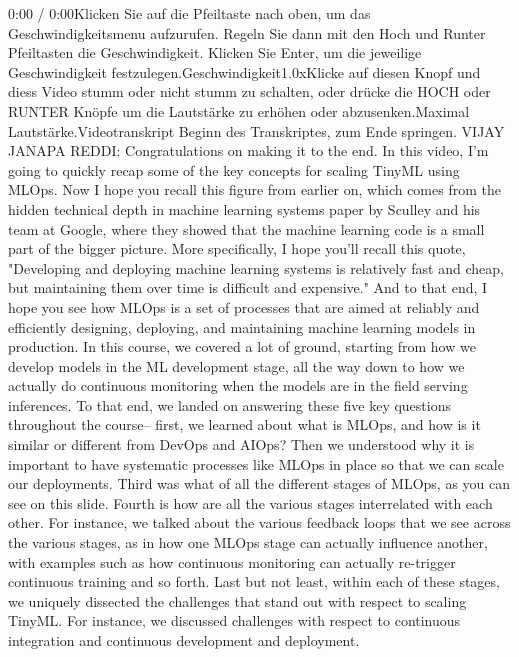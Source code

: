 {{{{{{{{    0:00 / 0:00Klicken Sie auf die Pfeiltaste nach oben, um das Geschwindigkeitsmenu aufzurufen. Regeln Sie dann mit den Hoch und Runter Pfeiltasten die Geschwindigkeit. Klicken Sie Enter, um die jeweilige Geschwindigkeit festzulegen.Geschwindigkeit1.0xKlicke auf diesen Knopf und diess Video stumm oder nicht stumm zu schalten, oder drücke die HOCH oder RUNTER Knöpfe um die Lautstärke zu erhöhen oder abzusenken.Maximal Lautstärke.Videotranskript
    Beginn des Transkriptes, zum Ende springen.
    VIJAY JANAPA REDDI: Congratulations on making it to the end.
    In this video, I'm going to quickly recap
    some of the key concepts for scaling TinyML using MLOps.
    Now I hope you recall this figure from earlier on, which
    comes from the hidden technical depth in machine learning systems
    paper by Sculley and his team at Google, where
    they showed that the machine learning code is a small part of the bigger
    picture.
    More specifically, I hope you'll recall this quote,
    "Developing and deploying machine learning systems
    is relatively fast and cheap, but maintaining them over time
    is difficult and expensive."
    And to that end, I hope you see how MLOps
    is a set of processes that are aimed at reliably and efficiently designing,
    deploying, and maintaining machine learning models in production.
    In this course, we covered a lot of ground,
    starting from how we develop models in the ML development stage, all the way
    down to how we actually do continuous monitoring when the models are
    in the field serving inferences.
    To that end, we landed on answering these five
    key questions throughout the course--
    first, we learned about what is MLOps, and how is it similar or different
    from DevOps and AIOps?
    Then we understood why it is important to have systematic processes like MLOps
    in place so that we can scale our deployments.
    Third was what of all the different stages of MLOps,
    as you can see on this slide.
    Fourth is how are all the various stages interrelated with each other.
    For instance, we talked about the various feedback loops
    that we see across the various stages, as in how one MLOps stage can actually
    influence another, with examples such as how continuous monitoring can actually
    re-trigger continuous training and so forth.
    Last but not least, within each of these stages, we uniquely dissected
    the challenges that stand out with respect to scaling TinyML.
    For instance, we discussed challenges with respect
    to continuous integration and continuous development and deployment.
}}}}}}}}

